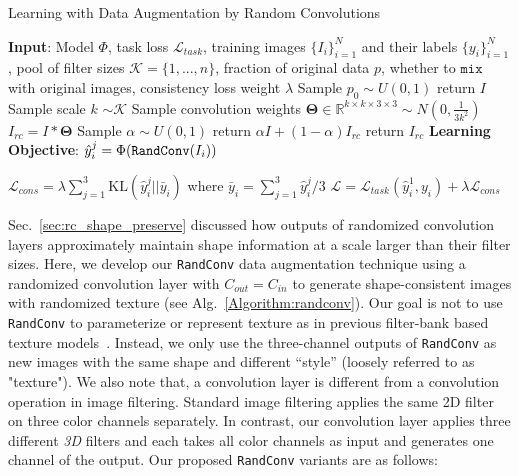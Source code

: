 \documentclass{article} \usepackage{iclr2021_conference,times}
\newcommand{\RandConv}{\texttt{RandConv}}
\begin{document}
\begin{algorithm}[h]
	\small
	\caption{Learning with Data Augmentation by Random Convolutions}
	\label{Algorithm:randconv}
	\begin{algorithmic}[1]
		\State \textbf{Input}: Model $\Phi$, task loss $\mathcal{L}_{task}$, training images $\{I_i\}_{i=1}^N$ and their labels $\{y_i\}_{i=1}^N$, pool of filter sizes $\mathcal{K}=\{1,...,n\}$, fraction of original data $p$, whether to $\mathtt{mix}$ with original images, consistency loss weight $\lambda$
\Function{$\text{{\RandConv}}$}{I, $\mathcal{K}$, $\mathtt{mix}$, $p$}
		\State Sample $p_0 \sim U(0, 1)$
		\State return $I$ 		
		\Else 
		\State Sample scale $k$ $\sim \mathcal{K}$
		\State Sample convolution weights $\mathbf{\Theta}\in\mathbb{R}^{k\times k \times 3\times 3} \sim N(0, \frac{1}{3 k^2})$
		\State $I_{rc} = I*\mathbf{\Theta}$ 
		\State Sample $\alpha \sim U(0, 1)$
		\State return $\alpha I + (1-\alpha)I_{rc}$ 
		\Else
		\State return $I_{rc}$
		\EndIf
		\EndIf
		\EndFunction
		\State \textbf{Learning Objective}:
\State $\hat{y}_{i}^j = \Phi(\text{{\RandConv}}(I_i))$ 
		
		\EndFor
		\State $\mathcal{L}_{cons} = \lambda\sum_{j=1}^{3}\text{KL}(\hat{y}^j_{i}|| \bar{y}_{i})$ where $\bar{y}_i = \sum_{j=1}^{3}\hat{y}_{i}^j/3$ 
		\State  $\mathcal{L} = \mathcal{L}_{task}(\hat{y}_{i}^1, y_i) + \lambda\mathcal{L}_{cons}$ 	
		\EndFor	
\end{algorithmic}
\end{algorithm}

Sec.~\ref{sec:rc_shape_preserve} discussed how outputs of randomized convolution layers approximately maintain shape information at a scale larger than their filter sizes. Here, we develop our {\RandConv} data augmentation technique using a randomized convolution layer with $C_{out}=C_{in}$ to generate shape-consistent images with randomized texture (see Alg.~\ref{Algorithm:randconv}). {Our goal is not to use {\RandConv} to parameterize or represent texture as in previous filter-bank based texture models~\citep{heeger1995pyramid, portilla2000parametric}. Instead, we only use the three-channel outputs of {\RandConv} as new images with the same shape and different “style” (loosely referred to as "texture"). We also note that, a convolution layer is different from a convolution operation in image filtering. Standard image filtering applies the same 2D filter on three color channels separately. In contrast, our convolution layer applies three different \emph{3D} filters and each takes all color channels as input and generates one channel of the output.}
Our proposed {\RandConv} variants are as follows:
\end{document}
